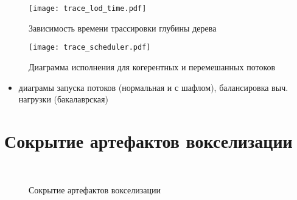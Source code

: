 \begin{figure}[h]
\center
\texttt{[image: trace\_lod\_time.pdf]}
\caption{Зависимость времени трассировки глубины дерева}
\label{fig:trace_lod_time}
\end{figure}


\begin{figure}[h]
\center
\texttt{[image: trace\_scheduler.pdf]}
\caption{Диаграмма исполнения для когерентных и перемешанных потоков}
\label{fig:trace_scheduler}
\end{figure}


\begin{itemize}
  \item диаграмы запуска потоков (нормальная и с шафлом), балансировка выч. нагрузки (бакалаврская)
\end{itemize}


\section{Сокрытие артефактов вокселизации}

\begin{figure}[h]
  \begin{center}
     \\
  \end{center}
  \caption{Сокрытие артефактов вокселизации}
  \label{fig:edge}
\end{figure}
